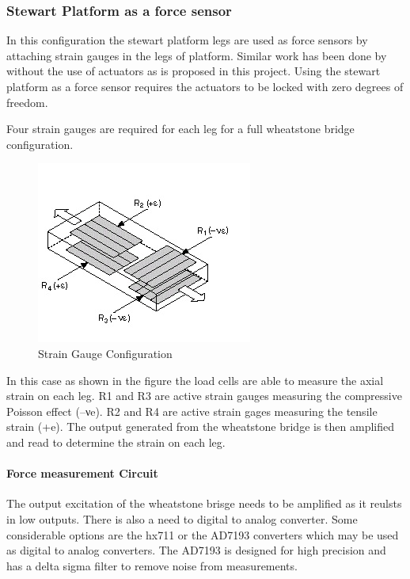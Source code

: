 \subsubsection{Stewart Platform as a force sensor}
In this configuration the stewart platform legs are used as force sensors by attaching strain gauges in the legs of platform. Similar work has been done by \cite{ferreira2015design} without the use of actuators as is proposed in this project. Using the stewart platform as a force sensor requires the actuators to be locked with zero degrees of freedom.

Four strain gauges are required for each leg for a full wheatstone bridge configuration. 
\begin{center}
	\begin{figure}[!h]
		\centering
		\includegraphics{Figures/loadConf}
		\caption[Strain Gauge Configuration]{Strain Gauge Configuration \cite{noauthor_measuring_nodate}}
	\end{figure}
\end{center}
In this case as shown in the figure the load cells are able to measure the axial strain on each leg. R1 and R3 are active strain gauges measuring the compressive Poisson effect (–νe). R2 and R4 are active strain gages measuring the tensile strain (+e). The output generated from the wheatstone bridge is then amplified and read to determine the strain on each leg.

\paragraph{Force measurement Circuit}
The output excitation of the wheatstone brisge needs to be amplified as it reulsts in low outputs. There is also a need to digital to analog converter. Some considerable options are the hx711 or the AD7193 converters which may be used as digital to analog converters. The AD7193 is designed for high precision and has a delta sigma filter to remove noise from measurements. 

